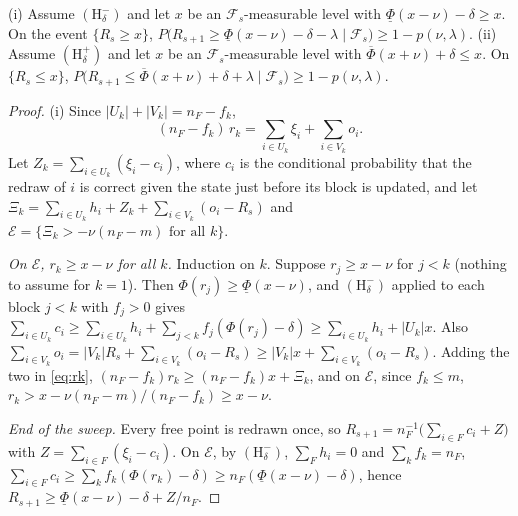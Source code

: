 \begin{lemma}\label{lem:sweep}
(i) Assume $(\mathrm H^-_\delta)$ and let $x$ be an $\mathcal F_s$-measurable level with $\underline\Phi(x-\nu)-\delta\ge x$.
On the event $\{R_s\ge x\}$,
$P\big(R_{s+1}\ge\underline\Phi(x-\nu)-\delta-\lambda\mid\mathcal F_s\big)\ge1-p(\nu,\lambda)$.
(ii) Assume $(\mathrm H^+_\delta)$ and let $x$ be an $\mathcal F_s$-measurable level with $\overline\Phi(x+\nu)+\delta\le x$. On $\{R_s\le x\}$,
$P\big(R_{s+1}\le\overline\Phi(x+\nu)+\delta+\lambda\mid\mathcal F_s\big)\ge1-p(\nu,\lambda)$.
\end{lemma}
\begin{proof}
(i) Since $\lvert U_k\rvert+\lvert V_k\rvert=n_F-f_k$,
\begin{equation}\label{eq:rk}
  (n_F-f_k)\,r_k=\sum_{i\in U_k}\xi_i+\sum_{i\in V_k}o_i .
\end{equation}
Let $Z_k=\sum_{i\in U_k}(\xi_i-c_i)$, where $c_i$ is the conditional probability that the redraw of $i$ is correct given
the state just before its block is updated, and let
$\Xi_k=\sum_{i\in U_k}h_i+Z_k+\sum_{i\in V_k}(o_i-R_s)$ and $\mathcal E=\{\Xi_k>-\nu(n_F-m)\text{ for all }k\}$.

\emph{On $\mathcal E$, $r_k\ge x-\nu$ for all $k$.} Induction on $k$. Suppose $r_j\ge x-\nu$ for $j<k$ (nothing to assume for
$k=1$). Then $\Phi(r_j)\ge\underline\Phi(x-\nu)$, and $(\mathrm H^-_\delta)$ applied to each block $j<k$ with
$f_j>0$ gives $\sum_{i\in U_k}c_i\ge\sum_{i\in U_k}h_i+\sum_{j<k}f_j(\Phi(r_j)-\delta)\ge\sum_{i\in U_k}h_i+\lvert U_k\rvert x$.
Also $\sum_{i\in V_k}o_i=\lvert V_k\rvert R_s+\sum_{i\in V_k}(o_i-R_s)\ge\lvert V_k\rvert x+\sum_{i\in V_k}(o_i-R_s)$. Adding the
two in \eqref{eq:rk}, $(n_F-f_k)r_k\ge(n_F-f_k)x+\Xi_k$, and on $\mathcal E$, since $f_k\le m$,
$r_k>x-\nu(n_F-m)/(n_F-f_k)\ge x-\nu$.

\emph{End of the sweep.} Every free point is redrawn once, so $R_{s+1}=n_F^{-1}\big(\sum_{i\in F}c_i+Z\big)$ with
$Z=\sum_{i\in F}(\xi_i-c_i)$. On $\mathcal E$, by $(\mathrm H^-_\delta)$, $\sum_Fh_i=0$ and $\sum_kf_k=n_F$,
$\sum_{i\in F}c_i\ge\sum_kf_k(\Phi(r_k)-\delta)\ge n_F(\underline\Phi(x-\nu)-\delta)$, hence
$R_{s+1}\ge\underline\Phi(x-\nu)-\delta+Z/n_F$.


\end{proof}

